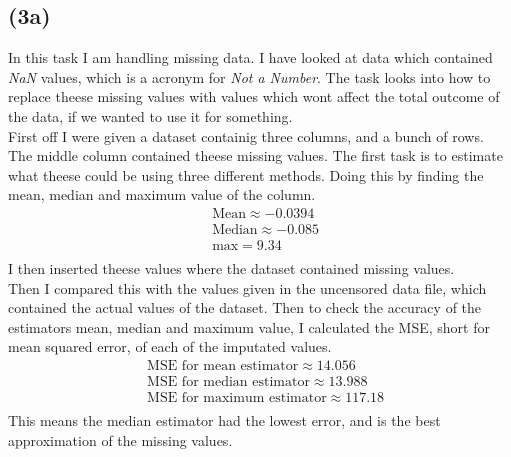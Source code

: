 \documentclass[12pt, letterpaper]{article}
\begin{document}
    \subsection*{(3a)}
      In this task I am handling missing data. I have looked at data which contained \textit{NaN} values, which is a acronym for \textit{Not a Number}. The task looks into how to replace theese missing values with values which wont affect the total outcome of the data, if we wanted to use it for something.\\
      First off I were given a dataset containig three columns, and a bunch of rows. The middle column contained theese missing values. The first task is to estimate what theese could be using three different methods. Doing this by finding the mean, median and maximum value of the column.\\
      \begin{align*}
        &\text{Mean} \approx -0.0394\\
        &\text{Median} \approx -0.085\\
        &\text{max} = 9.34\\
      \end{align*}
      I then inserted theese values where the dataset contained missing values.\\
      Then I compared this with the values given in the uncensored data file, which contained the actual values of the dataset. Then to check the accuracy of the estimators mean, median and maximum value, I calculated the MSE, short for mean squared error, of each of the imputated values.
      \begin{align*}
        &\text{MSE for mean estimator} \approx 14.056\\
        &\text{MSE for median estimator} \approx 13.988\\
        &\text{MSE for maximum estimator} \approx 117.18\\
      \end{align*}
      This means the median estimator had the lowest error, and is the best approximation of the missing values.
\end{document}
